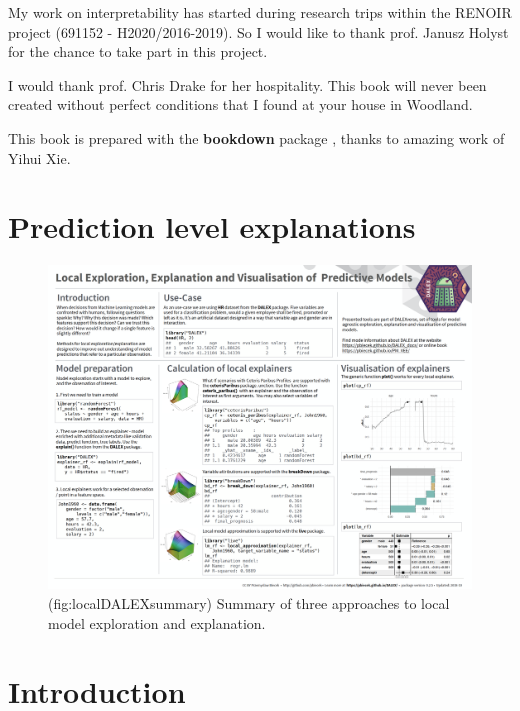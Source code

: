 \documentclass[]{krantz}
\theoremstyle{definition}
\theoremstyle{definition}
\theoremstyle{definition}
\theoremstyle{remark}
\begin{document}
My work on interpretability has started during research trips within the
RENOIR project (691152 - H2020/2016-2019). So I would like to thank
prof. Janusz Holyst for the chance to take part in this project.

I would thank prof. Chris Drake for her hospitality. This book will
never been created without perfect conditions that I found at your house
in Woodland.

This book is prepared with the \textbf{bookdown} package
\citep{R-bookdown}, thanks to amazing work of Yihui Xie.

\hypertarget{prediction-level-explanations}{%
\section*{Prediction level
explanations}\label{prediction-level-explanations}}

\begin{figure}

{\centering \includegraphics[width=0.99\linewidth]{figure/DALEX_local} 

}

\caption{(fig:localDALEXsummary) Summary of three approaches to local model exploration and explanation.}\label{fig:localDALEXsummary}
\end{figure}

\hypertarget{PredictionExplainers}{%
\section{Introduction}\label{PredictionExplainers}}
\end{document}
